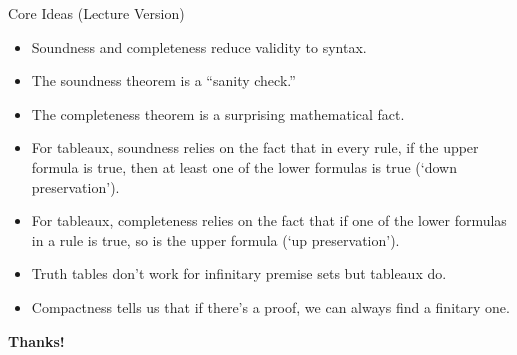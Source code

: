 \documentclass[../slides.tex]{subfiles}
\begin{document}
\begin{frame}{Core Ideas (Lecture Version)}


\begin{itemize}

	\item Soundness and completeness reduce validity to syntax.
	
	\item The soundness theorem is a ``sanity check.''
	
	\item The completeness theorem is a surprising mathematical fact.
		
	\item For tableaux, soundness relies on the fact that in every rule, if the upper formula is true, then at least one of the lower formulas is true (`down preservation').
	
	\item For tableaux, completeness relies on the fact that if one of the lower formulas in a rule is true, so is the upper formula (`up preservation').
	
	\item Truth tables don't work for infinitary premise sets but tableaux do.
	
	\item Compactness tells us that if there's a proof, we can always find a finitary one.

\end{itemize}

\end{frame}



\begin{frame}

	\begin{center}
	{\huge\bf Thanks!}
	\end{center}

\end{frame}
\end{document}
